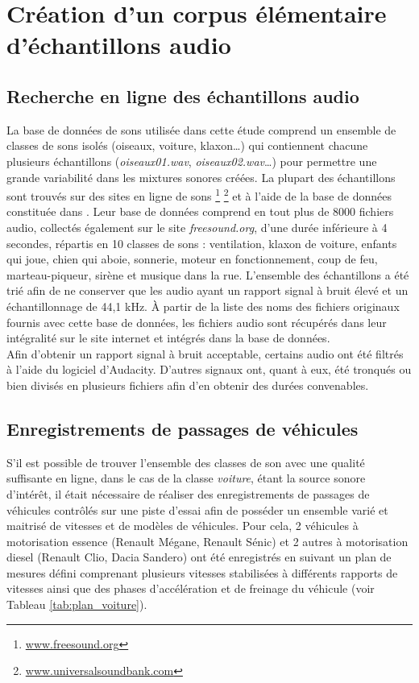 \section{Création d'un corpus élémentaire d'échantillons audio}

\subsection{Recherche en ligne des échantillons audio}

La base de données de sons utilisée dans cette étude comprend un ensemble de classes de sons isolés (oiseaux, voiture, klaxon\dots) qui contiennent chacune plusieurs échantillons (\textit{oiseaux01.wav}, \textit{oiseaux02.wav}\dots) pour permettre une grande variabilité dans les mixtures sonores créées. La plupart des échantillons sont trouvés sur des sites en ligne de sons \footnote{\url{www.freesound.org}} \footnote{\url{www.universalsoundbank.com}} et à l'aide de la base de données constituée dans  \cite{salamon_dataset_nodate}. Leur base de données comprend en tout plus de 8000 fichiers audio, collectés également sur le site \textit{freesound.org}, d'une durée inférieure à 4 secondes, répartis en 10 classes de sons : ventilation, klaxon de voiture, enfants qui joue, chien qui aboie, sonnerie, moteur en fonctionnement, coup de feu, marteau-piqueur, sirène et musique dans la rue. L'ensemble des échantillons a été trié afin de ne conserver que les audio ayant un rapport signal à bruit élevé et un échantillonnage de 44,1 kHz. \`A partir de la liste des noms des fichiers originaux fournis avec cette base de données, les fichiers audio sont récupérés dans leur intégralité sur le site internet et intégrés dans la base de données.\\
Afin d'obtenir un rapport signal à bruit acceptable, certains audio ont été filtrés à l'aide du logiciel d'Audacity. D'autres signaux ont, quant à eux, été tronqués ou bien divisés en plusieurs fichiers afin d'en obtenir des durées convenables.

\subsection{Enregistrements de passages de véhicules}\label{part:voiture_record}
S'il est possible de trouver l'ensemble des classes de son avec une qualité suffisante en ligne, dans le cas de la classe \textit{voiture}, étant la source sonore d'intérêt, il était nécessaire de réaliser des enregistrements de passages de véhicules contrôlés sur une piste d'essai afin de posséder un ensemble varié et maitrisé de vitesses et de modèles de véhicules. Pour cela, 2 véhicules à motorisation essence (Renault Mégane, Renault Sénic) et 2 autres à motorisation diesel (Renault Clio, Dacia Sandero) ont été enregistrés en suivant un plan de mesures défini comprenant plusieurs vitesses stabilisées à différents rapports de vitesses ainsi que des phases d'accélération et de freinage du véhicule (voir Tableau \ref{tab:plan_voiture}).


